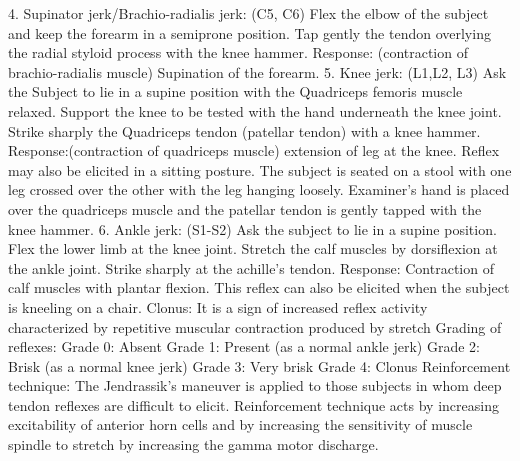 \documentclass[a4paper,12pt]{book}
\begin{document}
4. Supinator jerk/Brachio-radialis jerk: (C5, C6)
Flex the elbow of the subject and keep the forearm in a semiprone position. Tap gently the tendon overlying the radial styloid process with the knee hammer.
Response: (contraction of brachio-radialis muscle) Supination of the forearm.
5. Knee jerk: (L1,L2, L3)
Ask the Subject to lie in a supine position with the Quadriceps femoris muscle relaxed. Support the knee to be tested with the hand underneath the knee joint. Strike sharply the Quadriceps tendon (patellar tendon) with a knee hammer.
Response:(contraction of quadriceps muscle) extension of leg at the knee. Reflex may also be elicited in a sitting posture. The subject is seated on a stool
with one leg crossed over the other with the leg hanging loosely. Examiner's hand is placed over the quadriceps muscle and the patellar tendon is gently tapped with the knee hammer.
6. Ankle jerk: (S1-S2)
Ask the subject to lie in a supine position. Flex the lower limb at the knee joint. Stretch the calf muscles by dorsiflexion at the ankle joint. Strike sharply at the achille's tendon.
Response: Contraction of calf muscles with plantar flexion.
This reflex can also be elicited when the subject is kneeling on a chair.
Clonus: It is a sign of increased reflex activity characterized by repetitive muscular contraction produced by stretch
Grading of reflexes:
Grade 0: Absent
Grade 1: Present (as a normal ankle jerk)
Grade 2: Brisk (as a normal knee jerk)
Grade 3: Very brisk
Grade 4: Clonus
Reinforcement technique:
The Jendrassik's maneuver is applied to those subjects in whom deep tendon reflexes are difficult to elicit. Reinforcement technique acts by increasing excitability of anterior horn cells and by increasing the sensitivity of muscle spindle to stretch by increasing the gamma motor discharge.
	
\end{document}

